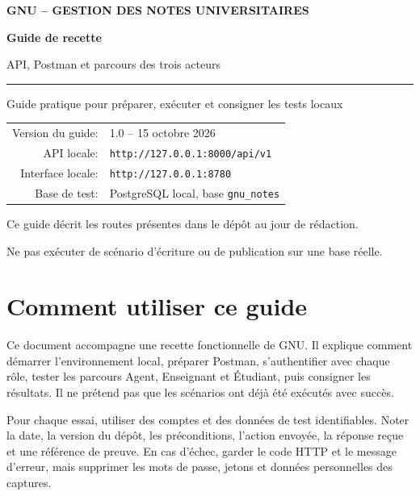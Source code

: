 \documentclass[10pt,a4paper]{article}
\begin{document}
\begin{titlepage}
\centering
\vspace*{1.5cm}
{\Large\bfseries\color{gnuTeal} GNU -- GESTION DES NOTES UNIVERSITAIRES\par}
\vspace{1.4cm}
{\Huge\bfseries\color{gnuNavy} Guide de recette\par}
\vspace{0.25cm}
{\LARGE API, Postman et parcours des trois acteurs\par}
\vspace{1cm}
\rule{0.78\linewidth}{1pt}\par
\vspace{0.7cm}
{\large Guide pratique pour préparer, exécuter et consigner les tests locaux\par}
\vfill
\begin{tabular}{rl}
Version du guide: & 1.0 -- 15 octobre 2026 \\
API locale: & \texttt{http://127.0.0.1:8000/api/v1} \\
Interface locale: & \texttt{http://127.0.0.1:8780} \\
Base de test: & PostgreSQL local, base \texttt{gnu\_notes} \\
\end{tabular}
\vfill
{\large Ce guide décrit les routes présentes dans le dépôt au jour de rédaction.\par}
\vspace{0.4cm}
{\color{muted} Ne pas exécuter de scénario d’écriture ou de publication sur une base réelle.\par}
\end{titlepage}

\setcounter{tocdepth}{1}
\tableofcontents
\clearpage
{}

\section{Comment utiliser ce guide}

Ce document accompagne une recette fonctionnelle de GNU. Il explique comment démarrer l’environnement local, préparer Postman, s’authentifier avec chaque rôle, tester les parcours Agent, Enseignant et Étudiant, puis consigner les résultats. Il ne prétend pas que les scénarios ont déjà été exécutés avec succès.

Pour chaque essai, utiliser des comptes et des données de test identifiables. Noter la date, la version du dépôt, les préconditions, l’action envoyée, la réponse reçue et une référence de preuve. En cas d’échec, garder le code HTTP et le message d’erreur, mais supprimer les mots de passe, jetons et données personnelles des captures.
\end{document}
